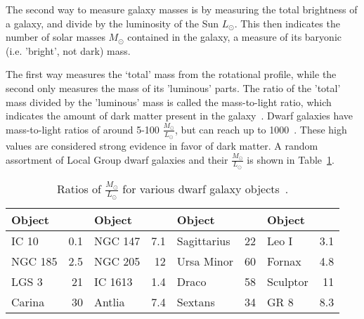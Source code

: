 The second way to measure galaxy masses is by measuring the total brightness of a galaxy, and divide by the luminosity of the Sun $L_\odot$.
This then indicates the number of solar masses $M_\odot$ contained in the galaxy, a measure of its baryonic (i.e. 'bright', not dark) mass.
    
The first way measures the `total' mass from the rotational profile, while the second only measures the mass of its 'luminous' parts.
The ratio of the 'total' mass divided by the 'luminous' mass is called the mass-to-light ratio, which indicates the amount of dark matter present in the galaxy~\cite{faber_ml}.
Dwarf galaxies have mass-to-light ratios of around 5-100 $\frac{M_\odot}{L_\odot}$, but can reach up to \nicetilde \SI{1000}{}~\cite{Simon2007_dwarfgalaxykeck}.
These high values are considered strong evidence in favor of dark matter.
A random assortment of Local Group dwarf galaxies and their $\frac{M_\odot}{L_\odot}$ is shown in Table~\ref{tab:mlratios:dwarfgals}.
    
\begin{table}[]
  \centering
  \begin{tabular}{l r | l r | l r | l r}
    Object      &  \mlratio{} & Object & \mlratio{} & Object & \mlratio{} & Object & \mlratio{} \\
    \hline
    IC 10       &  0.1 & NGC 147    &  7.1 & Sagittarius & 22 & Leo I    &  3.1 \\
    NGC 185     &  2.5 & NGC 205    & 12   & Ursa Minor  & 60 & Fornax   &  4.8 \\
    LGS 3       & 21   & IC 1613    &  1.4 & Draco       & 58 & Sculptor & 11   \\
    Carina      & 30   & Antlia     &  7.4 & Sextans     & 34 & GR 8     &  8.3 \\
  \end{tabular}
  \caption[Ratios of $\frac{M_\odot}{L_\odot}$ for Various Dwarf Galaxy Objects]{
    Ratios of $\frac{M_\odot}{L_\odot}$ for various dwarf galaxy objects~\cite{localdwarfs}.
  }
  \label{tab:mlratios:dwarfgals}
\end{table}
    
